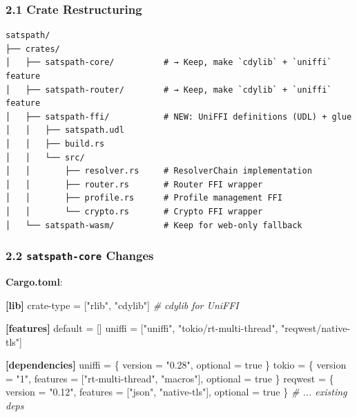 \documentclass[
]{article}
\newenvironment{Shaded}{}{}
\newcommand{\CommentTok}[1]{\textcolor[rgb]{0.38,0.63,0.69}{\textit{#1}}}
\newcommand{\ConstantTok}[1]{\textcolor[rgb]{0.53,0.00,0.00}{#1}}
\newcommand{\DataTypeTok}[1]{\textcolor[rgb]{0.56,0.13,0.00}{#1}}
\newcommand{\KeywordTok}[1]{\textcolor[rgb]{0.00,0.44,0.13}{\textbf{#1}}}
\newcommand{\OperatorTok}[1]{\textcolor[rgb]{0.40,0.40,0.40}{#1}}
\newcommand{\StringTok}[1]{\textcolor[rgb]{0.25,0.44,0.63}{#1}}
\begin{document}
\hypertarget{crate-restructuring}{%
\subsubsection{2.1 Crate Restructuring}\label{crate-restructuring}}

\begin{verbatim}
satspath/
├── crates/
│   ├── satspath-core/          # → Keep, make `cdylib` + `uniffi` feature
│   ├── satspath-router/        # → Keep, make `cdylib` + `uniffi` feature
│   ├── satspath-ffi/           # NEW: UniFFI definitions (UDL) + glue
│   │   ├── satspath.udl
│   │   ├── build.rs
│   │   └── src/
│   │       ├── resolver.rs     # ResolverChain implementation
│   │       ├── router.rs       # Router FFI wrapper
│   │       ├── profile.rs      # Profile management FFI
│   │       └── crypto.rs       # Crypto FFI wrapper
│   └── satspath-wasm/          # Keep for web-only fallback
\end{verbatim}

\hypertarget{satspath-core-changes}{%
\subsubsection{\texorpdfstring{2.2 \texttt{satspath-core}
Changes}{2.2 satspath-core Changes}}\label{satspath-core-changes}}

\textbf{Cargo.toml}:

\begin{Shaded}
\begin{Highlighting}[]
\KeywordTok{[lib]}
\DataTypeTok{crate{-}type} \OperatorTok{=} \OperatorTok{[}\StringTok{"rlib"}\OperatorTok{,} \StringTok{"cdylib"}\OperatorTok{]}  \CommentTok{\# cdylib for UniFFI}

\KeywordTok{[features]}
\DataTypeTok{default} \OperatorTok{=} \OperatorTok{[]}
\DataTypeTok{uniffi} \OperatorTok{=} \OperatorTok{[}\StringTok{"uniffi"}\OperatorTok{,} \StringTok{"tokio/rt{-}multi{-}thread"}\OperatorTok{,} \StringTok{"reqwest/native{-}tls"}\OperatorTok{]}

\KeywordTok{[dependencies]}
\DataTypeTok{uniffi} \OperatorTok{=} \OperatorTok{\{ }\DataTypeTok{version}\OperatorTok{ =} \StringTok{"0.28"}\OperatorTok{, }\DataTypeTok{optional}\OperatorTok{ =} \ConstantTok{true}\OperatorTok{ \}}
\DataTypeTok{tokio} \OperatorTok{=} \OperatorTok{\{ }\DataTypeTok{version}\OperatorTok{ =} \StringTok{"1"}\OperatorTok{, }\DataTypeTok{features}\OperatorTok{ =} \OperatorTok{[}\StringTok{"rt{-}multi{-}thread"}\OperatorTok{,} \StringTok{"macros"}\OperatorTok{], }\DataTypeTok{optional}\OperatorTok{ =} \ConstantTok{true}\OperatorTok{ \}}
\DataTypeTok{reqwest} \OperatorTok{=} \OperatorTok{\{ }\DataTypeTok{version}\OperatorTok{ =} \StringTok{"0.12"}\OperatorTok{, }\DataTypeTok{features}\OperatorTok{ =} \OperatorTok{[}\StringTok{"json"}\OperatorTok{,} \StringTok{"native{-}tls"}\OperatorTok{], }\DataTypeTok{optional}\OperatorTok{ =} \ConstantTok{true}\OperatorTok{ \}}
\CommentTok{\# ... existing deps}
\end{Highlighting}
\end{Shaded}
\end{document}
